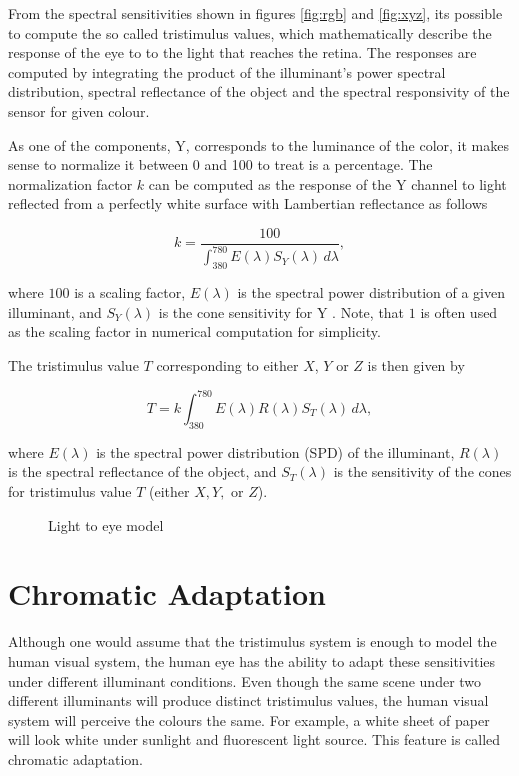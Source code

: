 From the spectral sensitivities shown in figures \ref{fig:rgb} and \ref{fig:xyz}, its possible to compute the so called tristimulus values, which mathematically describe the response of the eye to to the light that reaches the retina. The responses are computed by integrating the product of the illuminant's power spectral distribution, spectral reflectance of the object and the spectral responsivity of the sensor for given colour.

As one of the components, Y, corresponds to the luminance of the color, it makes sense to normalize it between 0 and 100 to treat is a percentage. The normalization factor $k$ can be computed as the response of the Y channel to light reflected from a perfectly white surface with Lambertian reflectance as follows

\begin{equation}
\label{eq:normalization}
 k = \frac{100}{\int_{380}^{780} E(\lambda) S_Y(\lambda) \, d\lambda},
\end{equation}

where $100$ is a scaling factor, $E(\lambda)$ is the spectral power distribution of a given illuminant, and $S_Y(\lambda)$ is the cone sensitivity for Y \cite{rowlands2020physics}. Note, that $1$ is often used as the scaling factor in numerical computation for simplicity.

The tristimulus value $T$ corresponding to either $X$, $Y$ or $Z$ is then given by

\begin{equation}
\label{eq:tristimulus}
T = k \int_{380}^{780} E(\lambda) R(\lambda) S_T(\lambda) \, d\lambda,
\end{equation}

where $E(\lambda)$ is the spectral power distribution (SPD) of the illuminant, $R(\lambda)$ is the spectral reflectance of the object, and $S_T(\lambda)$ is the sensitivity of the cones for tristimulus value \( T \) (either \( X, Y, \) or \( Z \)).

\begin{figure}
\centering

\caption{Light to eye model}
\label{fig:light}
\end{figure}

\section{Chromatic Adaptation}
\label{sec:chromaticadaptation}
Although one would assume that the tristimulus system is enough to model the human visual system, the human eye has the ability to adapt these sensitivities under different illuminant conditions. Even though the same scene under two different illuminants will produce distinct tristimulus values, the human visual system will perceive the colours the same. For example, a white sheet of paper will look white under sunlight and fluorescent light source. This feature is called chromatic adaptation. \cite[146-149]{fairchild}

